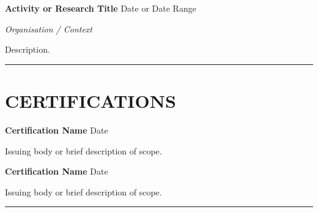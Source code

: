 \documentclass[11pt,a4paper]{article}
\newcommand{\sectrule}{\vspace{2pt}\hrule\vspace{3pt}}
\newcommand{\cventry}[2]{%
  {\color{heading}\textbf{#1}} \hfill {\color{lighttext}#2}\par%
}
\newcommand{\cvsubtitle}[1]{%
  {\color{body}\textit{#1}}\par%
}
\newcommand{\cvbody}[1]{%
  {\color{body}#1}\par%
}
\begin{document}
\vspace{3pt}

\cventry{Activity or Research Title}{Date or Date Range}
\cvsubtitle{Organisation / Context}
\cvbody{%
Description.
}

\vspace{2pt}
\sectrule

\section*{CERTIFICATIONS}

\cventry{Certification Name}{Date}
\cvbody{%
Issuing body or brief description of scope.
}

\vspace{3pt}

\cventry{Certification Name}{Date}
\cvbody{%
Issuing body or brief description of scope.
}

\vspace{2pt}
\sectrule
\end{document}
